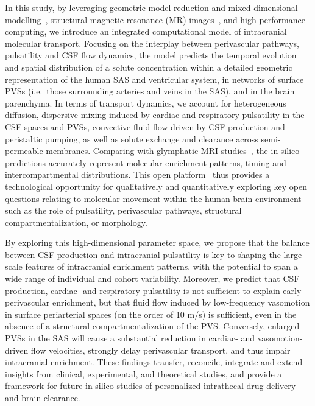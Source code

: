 \documentclass[fleqn,10pt]{wlscirep}
\begin{document}
In this study, by leveraging geometric model reduction and
mixed-dimensional modelling~\cite{masri2024modelling}, structural
magnetic resonance (MR) images~\cite{hodneland2019new}, and high
performance computing, we introduce an integrated computational model
of intracranial molecular transport. Focusing on the interplay between
perivascular pathways, pulsatility and CSF flow dynamics, the model
predicts the temporal evolution and spatial distribution of a solute
concentration within a detailed geometric representation of the human
SAS and ventricular system, in networks of surface PVSs (i.e.~those
surrounding arteries and veins in the SAS), and in the brain
parenchyma. In terms of transport dynamics, we account for
heterogeneous diffusion, dispersive mixing induced by cardiac and
respiratory pulsatility in the CSF spaces and PVSs, convective fluid
flow driven by CSF production and peristaltic pumping, as well as
solute exchange and clearance across semi-permeable
membranes. Comparing with glymphatic MRI
studies~\cite{ringstad2017glymphatic, ringstad2018brain,
  watts2019measuring, eide2024functional}, the in-silico predictions
accurately represent molecular enrichment patterns, timing and
intercompartmental distributions. This open platform~\cite{ZENODO}
thus provides a technological opportunity for qualitatively and
quantitatively exploring key open questions relating to molecular
movement within the human brain environment such as the role of
pulsatility, perivascular pathways, structural compartmentalization,
or morphology.

By exploring this high-dimensional parameter space, we propose that
the balance between CSF production and intracranial pulsatility is key
to shaping the large-scale features of intracranial enrichment
patterns, with the potential to span a wide range of individual and
cohort variability. Moreover, we predict that CSF production, cardiac-
and respiratory pulsatility is not sufficient to explain early
perivascular enrichment, but that fluid flow induced by low-frequency
vasomotion in surface periarterial spaces (on the order of 10 \textmu
m/s) is sufficient, even in the absence of a structural
compartmentalization of the PVS. Conversely, enlarged PVSs in the SAS
will cause a substantial reduction in cardiac- and vasomotion-driven
flow velocities, strongly delay perivascular transport, and thus
impair intracranial enrichment. These findings transfer, reconcile, integrate and extend insights from clinical, experimental, and theoretical studies, and provide a framework for future in-silico studies of personalized intrathecal drug delivery and brain clearance.
\end{document}
